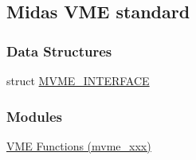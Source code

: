 \subsection{Midas VME standard}
\label{group__mvmestdinclude}
\subsubsection*{Data Structures}
\begin{DoxyCompactItemize}
\item 
struct \hyperlink{structMVME__INTERFACE}{MVME\_\-INTERFACE}
\end{DoxyCompactItemize}
\subsubsection*{Modules}
\begin{DoxyCompactItemize}
\item 
\hyperlink{group__mvmestdfunctionh}{VME Functions (mvme\_\-xxx)}
\end{DoxyCompactItemize}
